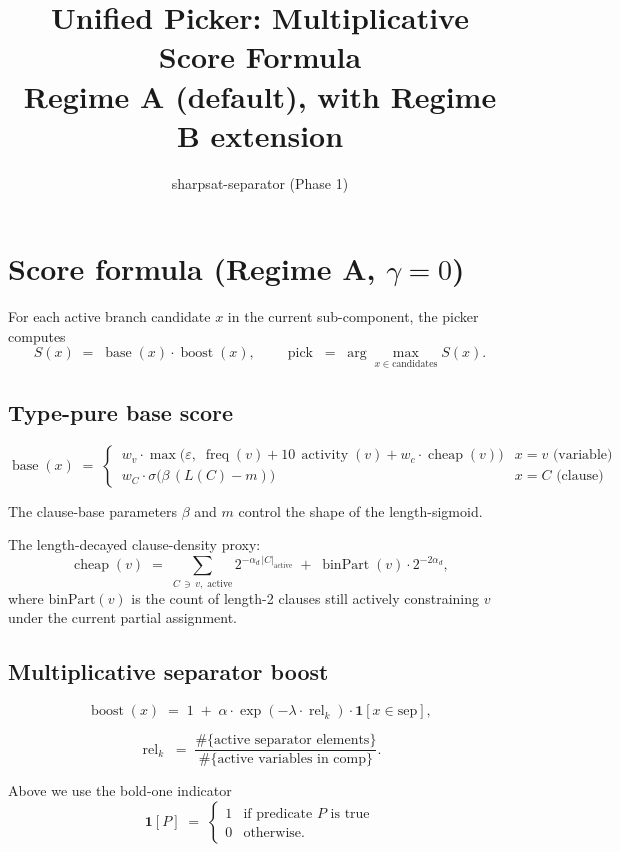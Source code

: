 \documentclass[11pt]{article}
\title{Unified Picker: Multiplicative Score Formula\\
       \large Regime A (default), with Regime B extension}
\author{sharpsat-separator (Phase 1)}
\date{}
\begin{document}
\maketitle

\section{Score formula (Regime A, $\gamma = 0$)}

For each active branch candidate $x$ in the current sub-component, the picker
computes
\[
S(x) \;=\; \operatorname{base}(x) \cdot \operatorname{boost}(x),
\qquad
\operatorname{pick} \;=\; \arg\max_{x \in \text{candidates}} S(x).
\]

\subsection*{Type-pure base score}

\[
\operatorname{base}(x) \;=\;
\begin{cases}
\, w_v \cdot \max\!\bigl(\varepsilon,\; \operatorname{freq}(v) + 10\,\operatorname{activity}(v) + w_c \cdot \operatorname{cheap}(v)\bigr)
   & x = v \text{ (variable)} \\[4pt]
\, w_C \cdot \sigma\!\bigl(\beta\,(L(C) - m)\bigr)
   & x = C \text{ (clause)}
\end{cases}
\]


The clause-base parameters $\beta$ and $m$ control the shape of the
length-sigmoid.

\noindent The length-decayed clause-density proxy:
\[
\operatorname{cheap}(v) \;=\; \sum_{C \,\ni\, v,\;\text{active}} 2^{-\alpha_d \, |C|_{\text{active}}}
\;+\; \operatorname{binPart}(v) \cdot 2^{-2\alpha_d},
\]
where
$\text{binPart}(v)$
is the count of length-2 clauses still actively constraining $v$
under the current partial assignment.

\subsection*{Multiplicative separator boost}

\[
\operatorname{boost}(x) \;=\; 1 \;+\; \alpha \cdot \exp(-\lambda \cdot \operatorname{rel}_k) \cdot \mathbf{1}[x \in \mathrm{sep}],
\]

\[
\operatorname{rel}_k \;=\; \frac{\#\{\text{active separator elements}\}}{\#\{\text{active variables in comp}\}}.
\]

Above we use the bold-one indicator
\[
\mathbf{1}[P] \;=\; \begin{cases} 1 & \text{if predicate } P \text{ is true} \\ 0 & \text{otherwise.} \end{cases}
\]
\end{document}
